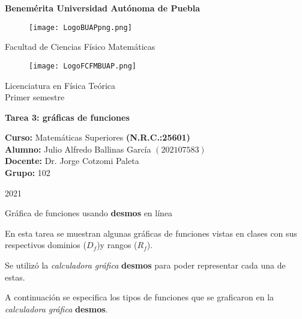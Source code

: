 \documentclass[12pt]{article}
\begin{document}
\thispagestyle{empty} 
\begin{center} \LARGE{\bf Benemérita Universidad Autónoma de Puebla} \\[0.5cm]
\begin{figure}[htb] \centering \texttt{[image: LogoBUAPpng.png]} \end{figure}
\LARGE{Facultad de Ciencias Físico Matemáticas}\\[0.5cm]
\begin{figure}[htb] \centering \texttt{[image: LogoFCFMBUAP.png]} \end{figure} 
\Large{Licenciatura en Física Teórica}\\[0.5cm]
\large{Primer semestre} \end{center}
\begin{center} { \Large \bfseries{Tarea 3: gráficas de funciones}} \\ \end{center}
\large{\bf Curso: } Matemáticas Superiores \textbf{(N.R.C.:25601)}\\
\large{\bf Alumno:} Julio Alfredo Ballinas García $\left(202107583\right)$ \\
\large{\bf Docente:} Dr. Jorge Cotzomi Paleta\\
\large{\bf Grupo:} 102\\ \begin{center} 
\vfill
\textsc{2021} \end{center}  
\newpage



\begin{center}
\Large{Gráfica de funciones usando \textbf{{\green desmos}} en línea}
\end{center}


En esta tarea se muestran algunas gráficas de funciones vistas en clases con sus respectivos dominios ($D_f$)y rangos ($R_f$). 

Se utilizó la \textit{calculadora gráfica} \textbf{{\green desmos}} para poder representar cada una de estas. 

A continuación se especifica los tipos de funciones que se graficaron en la \textit{calculadora gráfica} \textbf{{\green desmos}}. 
\end{document}
